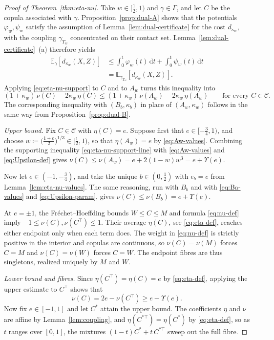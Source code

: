 \documentclass[11pt,a4paper]{article}
\theoremstyle{remark}
\newcommand{\E}{\mathbb{E}}
\newcommand{\de}{\,\mathrm{d}}
\newcommand{\1}{\mathbf{1}}
\newcommand{\CC}{\mathcal{C}}
\newcommand{\Gam}{\Gamma}
\begin{document}
\begin{proof}[Proof of Theorem~\ref{thm:eta-nu}]
Take $w\in[\frac12,1)$ and $\gamma\in\Gam$, and let $C$ be the copula associated with $\gamma$.
Proposition~\ref{prop:dual-A} shows that the potentials $\varphi_w,\psi_w$ satisfy the assumption of Lemma~\ref{lem:dual-certificate} for the cost $d_{\kappa_w}$, with the coupling $\gamma_{T_w}$ concentrated on their contact set.
Lemma~\ref{lem:dual-certificate}~(a) therefore yields
\[
  \begin{aligned}
  \E_\gamma[d_{\kappa_w}(X,Z)]
  &\le\int_0^1\varphi_w(t)\de t+\int_0^1\psi_w(t)\de t\\
  &=\E_{\gamma_{T_w}}[d_{\kappa_w}(X,Z)].
  \end{aligned}
\]
Applying \eqref{eq:eta-nu-support} to $C$ and to $A_w$ turns this inequality into
\begin{equation}
  \label{eq:eta-nu-support-line}
  (1+\kappa_w)\,\nu(C)-2\kappa_w\,\eta(C)
  \le(1+\kappa_w)\,\nu(A_w)-2\kappa_w\,\eta(A_w)
  \qquad\text{for every }C\in\CC.
\end{equation}
The corresponding inequality with $(B_b,\kappa_b)$ in place of $(A_w,\kappa_w)$ follows in the same way from Proposition~\ref{prop:dual-B}.

\smallskip\noindent\emph{Upper bound.}\quad
Fix $C\in\CC$ with $\eta(C)=e$.
Suppose first that $e\in[-\frac34,1)$, and choose $w\coloneqq\bigl(\frac{1+e}{2}\bigr)^{1/3}\in[\frac12,1)$, so that $\eta(A_w)=e$ by \eqref{eq:Aw-values}.
Combining the supporting inequality \eqref{eq:eta-nu-support-line} with \eqref{eq:Aw-values} and \eqref{eq:Upsilon-def} gives $\nu(C)\le\nu(A_w)=e+2(1-w)w^3=e+\Upsilon(e)$.

Now let $e\in(-1,-\frac34)$, and take the unique $b\in(0,\frac12)$ with $e_b=e$ from Lemma~\ref{lem:eta-nu-values}.
The same reasoning, run with $B_b$ and with \eqref{eq:Ba-values} and \eqref{eq:Upsilon-param}, gives $\nu(C)\le\nu(B_b)=e+\Upsilon(e)$.

At $e=\pm1$, the Fr\'echet--Hoeffding bounds $W\le C\le M$ \cite[Thm.~2.2.3]{nelsen2006introduction} and formula \eqref{eq:nu-def} imply $-1\le\nu(C),\nu(C^\top)\le1$.
Their average $\eta(C)$, see \eqref{eq:eta-def}, reaches either endpoint only when each term does.
The weight in \eqref{eq:nu-def} is strictly positive in the interior and copulas are continuous, so $\nu(C)=\nu(M)$ forces $C=M$ and $\nu(C)=\nu(W)$ forces $C=W$.
The endpoint fibres are thus singletons, realized uniquely by $M$ and $W$.

\smallskip\noindent\emph{Lower bound and fibres.}\quad
Since $\eta(C^\top)=\eta(C)=e$ by \eqref{eq:eta-def}, applying the upper estimate to $C^\top$ shows that
\[
  \nu(C)=2e-\nu(C^\top)\ge e-\Upsilon(e).
\]
Now fix $e\in[-1,1]$ and let $C^*$ attain the upper bound.
The coefficients $\eta$ and $\nu$ are affine by Lemma~\ref{lem:coupling}, and $\eta(C^{*\top})=\eta(C^*)$ by \eqref{eq:eta-def}, so as $t$ ranges over $[0,1]$, the mixtures $(1-t)C^*+t\,C^{*\top}$ sweep out the full fibre.


\end{proof}
\end{document}
